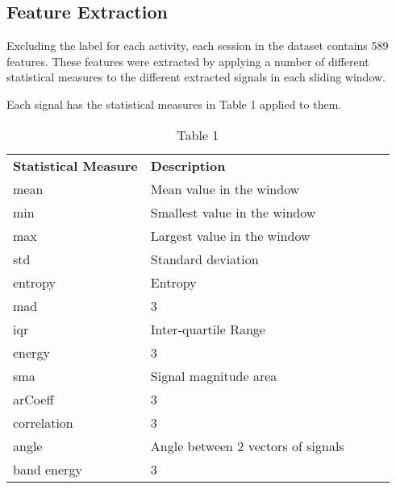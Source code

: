 \subsection{Feature Extraction}
    Excluding the label for each activity, each session in the dataset contains 589 features. These features were extracted by applying a number of different statistical
    measures to the different extracted signals in each sliding window.

    Each signal has the statistical measures in Table 1 applied to them.

    \begin{table}[ht]
        \begin{tabular}{|l|l|lll}
            \cline{1-2}
            \textbf{Statistical Measure} & \textbf{Description} &  &  &  \\ \cline{1-2}
            mean             & Mean value in the window           &  &  &  \\ \cline{1-2}
            min            & Smallest value in the window           &  &  &  \\ \cline{1-2}
            max            & Largest value in the window           &  &  & \\ \cline{1-2}
            std            & Standard deviation           &  &  & \\ \cline{1-2}
            entropy            & Entropy           &  &  & \\ \cline{1-2}
            mad            & 3           &  &  & \\ \cline{1-2}
            iqr            & Inter-quartile Range           &  &  & \\ \cline{1-2}
            energy            & 3           &  &  & \\ \cline{1-2}
            sma            & Signal magnitude area           &  &  & \\ \cline{1-2}
            arCoeff            & 3           &  &  & \\ \cline{1-2}
            correlation            & 3           &  &  & \\ \cline{1-2}
            angle            & Angle between 2 vectors of signals           &  &  & \\ \cline{1-2}
            band energy            & 3           &  &  & \\ \cline{1-2}
        \end{tabular}
        \caption*{Table 1}
    \end{table}

